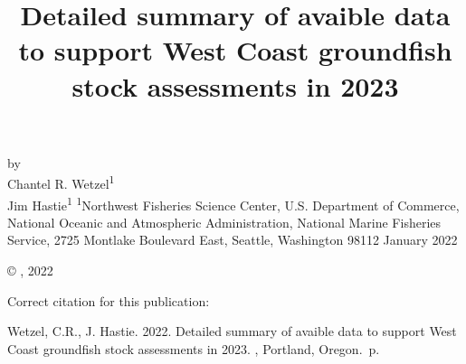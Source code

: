 \documentclass[11pt,
  english,
  letterpaper,
]{article}
\date{}
\newcommand{\trTitle}{Detailed summary of avaible data to support West Coast groundfish stock assessments in 2023}
\newcommand{\trYear}{2022}
\newcommand{\trMonth}{January}
\newcommand{\trAuthsBack}{Wetzel, C.R., J. Hastie}
\newcommand{\trCitation}{
\begin{hangparas}{1em}{1}
\trAuthsBack{}. \trYear{}. \trTitle{}. \glsentrylong{pfmc}, Portland, Oregon. \pageref{LastPage}{}\,p.
\end{hangparas}}
\begin{document}

\renewcommand*{\thefootnote}{\fnsymbol{footnote}}

\small
\thispagestyle{empty}
\noindent
\begin{center}
\title{Detailed summary of avaible data to support West Coast groundfish stock assessments in 2023}
\vspace{1.5cm}
{\Large\textbf{}}
\vfill
by\\
Chantel R. Wetzel\textsuperscript{1}\\
Jim Hastie\textsuperscript{1}\vfill
\textsuperscript{1}Northwest Fisheries Science Center, U.S. Department of Commerce, National Oceanic and Atmospheric Administration, National Marine Fisheries Service, 2725 Montlake Boulevard East, Seattle, Washington 98112\vfill
\trMonth{} \trYear{}
\end{center}
\clearpage

\thispagestyle{empty}
\vspace*{\fill}
\begin{center}
\copyright{} , \trYear{}\\
\end{center}
\par
\bigskip
\noindent
Correct citation for this publication:
\bigskip
\par
\trCitation{}
\clearpage


\tableofcontents\clearpage
\label{TRlastRoman}
\clearpage

\newpage
\thispagestyle{empty} %

\pagestyle{plain}  %
\renewcommand*{\thefootnote}{\arabic{footnote}}  %
\setcounter{footnote}{0}  %
\renewcommand{\headrulewidth}{0.5pt}
\renewcommand{\footrulewidth}{0.5pt}

\newcommand{\lt}{\ensuremath <}
\newcommand{\gt}{\ensuremath >}
\end{document}
